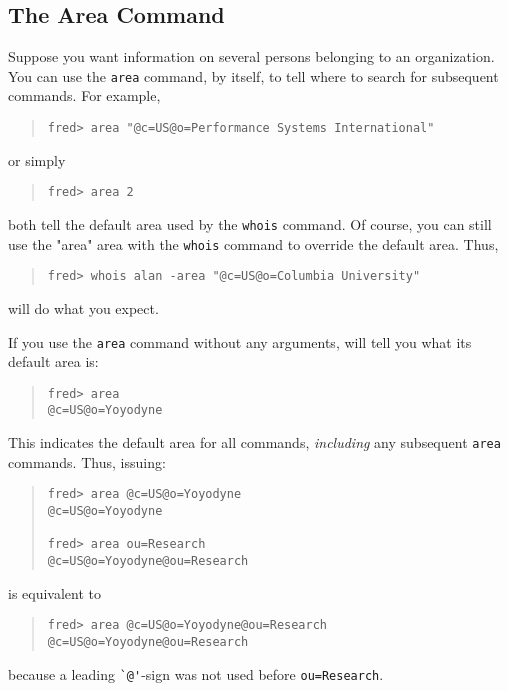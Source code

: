 \subsection	{The Area Command}
Suppose
you want information on several persons belonging to an organization.
You can use the \verb"area" command,
by itself,
to tell  where to search for subsequent commands.
For example,
\begin{quote}\small\begin{verbatim}
fred> area "@c=US@o=Performance Systems International"
\end{verbatim}\end{quote}
or simply
\begin{quote}\small\begin{verbatim}
fred> area 2
\end{verbatim}\end{quote}
both tell  the default area used by the \verb"whois" command.
Of course,
you can still use the \switch"area" area with the \verb"whois" command to
override the default area.
Thus,
\begin{quote}\small\begin{verbatim}
fred> whois alan -area "@c=US@o=Columbia University"
\end{verbatim}\end{quote}
will do what you expect.

If you use the \verb"area" command without any arguments,
 will tell you what its default area is:
\begin{quote}\small\begin{verbatim}
fred> area
@c=US@o=Yoyodyne
\end{verbatim}\end{quote}
This indicates the default area for all commands,
{\em including\/} any subsequent \verb"area" commands.
Thus,
issuing:
\begin{quote}\small\begin{verbatim}
fred> area @c=US@o=Yoyodyne
@c=US@o=Yoyodyne

fred> area ou=Research
@c=US@o=Yoyodyne@ou=Research
\end{verbatim}\end{quote}
is equivalent to
\begin{quote}\small\begin{verbatim}
fred> area @c=US@o=Yoyodyne@ou=Research
@c=US@o=Yoyodyne@ou=Research
\end{verbatim}\end{quote}
because a leading \verb"`@'"-sign was not used before \verb"ou=Research".

